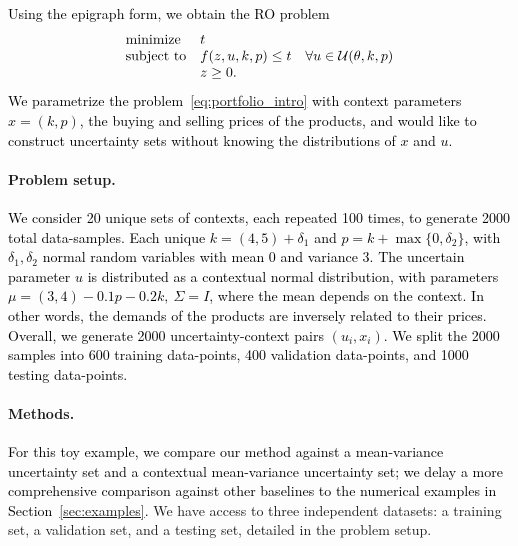 \documentclass[11pt]{article}
\newcommand{\bsnote}[1]{\noindent\textcolor{red}{\texttt{Bartolomeo: #1}}}
\newcommand{\RC}[1]{\textcolor{black}{#1}}
\begin{document}
\RC{Using the epigraph form, we obtain the \gls{RO} problem 
\begin{equation}\label{eq:portfolio_intro}
	\begin{array}{ll}
		\mbox{minimize} & t\\
		\mbox{subject to} & f(z,u,k,p) \le t \quad \forall u \in {\mathcal{U}}(\theta,k,p) \\
		&z \geq 0.
	\end{array}
\end{equation}
We parametrize the problem~\eqref{eq:portfolio_intro} with context parameters $x = (k,p)$, the buying and selling prices of the products, and would like to construct uncertainty sets without knowing the distributions of $x$ and $u$.}

\paragraph{Problem setup.}
\RC{We consider 20 unique sets of contexts, each repeated 100 times, to generate 2000 total data-samples. Each unique $k = (4,5) + \delta_1$ and $p = k + \max\{0,\delta_2\}$, with $\delta_1, \delta_2$ normal random variables with mean 0 and variance 3. 
The uncertain parameter $u$ is distributed as a contextual normal distribution, with parameters
$\mu = (3,4) -0.1p - 0.2k,~\Sigma =
	I$,
where the mean depends on the context. 
In other words, the demands of the products are inversely related to their prices. 
Overall, we generate 2000 uncertainty-context pairs $(u_i,x_i)$.
We split the 2000 samples into 600 training data-points, 400 validation data-points, and 1000 testing data-points.}

\paragraph{Methods.}
\RC{For this toy example, we compare our method against a mean-variance uncertainty set and a contextual mean-variance uncertainty set;
we delay a more comprehensive comparison against other baselines to the numerical examples in Section~\ref{sec:examples}.}
We have access to three independent datasets: a training set, a validation set, and a testing set, detailed in the problem setup. 
\end{document}
